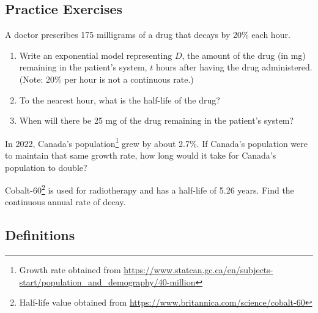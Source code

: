

\newpage


\subsection*{Practice Exercises} \label{practice-exponential-and-logarithmic-models}

\begin{myPractice}
A doctor prescribes 175 milligrams of a drug that decays by 20\% each hour.
\begin{enumerate}
\item Write an exponential model representing $D$, the amount of the drug (in mg) remaining in the patient's system, $t$ hours after having the drug administered.  (Note: 20\% per hour is not a continuous rate.)\\[0.35in]
	\item To the nearest hour, what is the half-life of the drug?
\vfill
	\item When will there be 25 mg of the drug remaining in the patient's system?
\vfill
\end{enumerate}\end{myPractice}


\begin{myPractice}
In 2022, Canada's population\footnote{Growth rate obtained from \url{https://www.statcan.gc.ca/en/subjects-start/population_and_demography/40-million}} grew by about 2.7\%.  If Canada's population were to maintain that same growth rate, how long would it take for Canada's population to double?
\vfill
\end{myPractice}

\begin{myPractice}
Cobalt-60\footnote{Half-life value obtained from \url{https://www.britannica.com/science/cobalt-60}} is used for radiotherapy and has a half-life of 5.26 years.  Find the continuous annual rate of decay.
\vfill
\end{myPractice}




\newpage

\subsection*{Definitions} \label{def-exponential-and-logarithmic-models}

